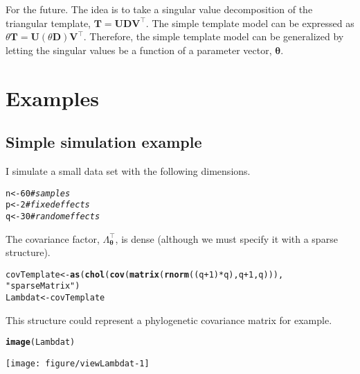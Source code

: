 \documentclass[12pt]{article}\usepackage[]{graphicx}\usepackage[]{color}
\makeatletter
\def\maxwidth{ %
  \ifdim\Gin@nat@width>\linewidth
    \linewidth
  \else
    \Gin@nat@width
  \fi
}
\newcommand{\hlnum}[1]{\textcolor[rgb]{0.686,0.059,0.569}{#1}}%
\newcommand{\hlstr}[1]{\textcolor[rgb]{0.192,0.494,0.8}{#1}}%
\newcommand{\hlcom}[1]{\textcolor[rgb]{0.678,0.584,0.686}{\textit{#1}}}%
\newcommand{\hlopt}[1]{\textcolor[rgb]{0,0,0}{#1}}%
\newcommand{\hlstd}[1]{\textcolor[rgb]{0.345,0.345,0.345}{#1}}%
\newcommand{\hlkwb}[1]{\textcolor[rgb]{0.69,0.353,0.396}{#1}}%
\newcommand{\hlkwd}[1]{\textcolor[rgb]{0.737,0.353,0.396}{\textbf{#1}}}%
\newenvironment{kframe}{%
 \def\at@end@of@kframe{}%
 \ifinner\ifhmode%
  \def\at@end@of@kframe{\end{minipage}}%
  \begin{minipage}{\columnwidth}%
 \fi\fi%
 \def\FrameCommand##1{\hskip\@totalleftmargin \hskip-\fboxsep
 \colorbox{shadecolor}{##1}\hskip-\fboxsep
     \hskip-\linewidth \hskip-\@totalleftmargin \hskip\columnwidth}%
 \MakeFramed {\advance\hsize-\width
   \@totalleftmargin\z@ \linewidth\hsize
   \@setminipage}}%
 {\par\unskip\endMakeFramed%
 \at@end@of@kframe}
\newenvironment{knitrout}{}{} %
\makeatother
\begin{document}
For the future.  The idea is to take a singular value decomposition of
the triangular template, $\bm T = \bm U \bm D \bm V^\top$.  The
simple template model can be expressed as $\theta\bm T = \bm U
(\theta\bm D) \bm V^\top$.  Therefore, the simple template model can be
generalized by letting the singular values be a function of a
parameter vector, $\bm\theta$.

\section{Examples}

\subsection{Simple simulation example}

I simulate a small data set with the following dimensions.
\begin{knitrout}
\color{fgcolor}\begin{kframe}
\begin{alltt}
\hlstd{n} \hlkwb{<-} \hlnum{60} \hlcom{# samples }
\hlstd{p} \hlkwb{<-} \hlnum{2}  \hlcom{# fixed effects}
\hlstd{q} \hlkwb{<-} \hlnum{30} \hlcom{# random effects}
\end{alltt}
\end{kframe}
\end{knitrout}
The covariance factor, $\Lambda_{\bm\theta}^\top$, is dense (although
we must specify it with a sparse structure).
\begin{knitrout}
\color{fgcolor}\begin{kframe}
\begin{alltt}
\hlstd{covTemplate} \hlkwb{<-} \hlkwd{as}\hlstd{(}\hlkwd{chol}\hlstd{(}\hlkwd{cov}\hlstd{(}\hlkwd{matrix}\hlstd{(}\hlkwd{rnorm}\hlstd{((q}\hlopt{+}\hlnum{1}\hlstd{)}\hlopt{*}\hlstd{q), q} \hlopt{+} \hlnum{1}\hlstd{, q))),}
                  \hlstr{"sparseMatrix"}\hlstd{)}
\hlstd{Lambdat} \hlkwb{<-} \hlstd{covTemplate}
\end{alltt}
\end{kframe}
\end{knitrout}
This structure could represent a phylogenetic covariance matrix for
example.
\begin{knitrout}
\color{fgcolor}\begin{kframe}
\begin{alltt}
\hlkwd{image}\hlstd{(Lambdat)}
\end{alltt}
\end{kframe}
\texttt{[image: figure/viewLambdat-1]} 

\end{knitrout}
\end{document}
